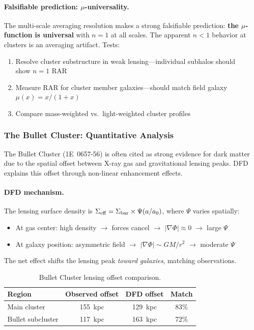 \paragraph{Falsifiable prediction: $\mu$-universality.}
The multi-scale averaging resolution makes a strong falsifiable prediction: \textbf{the $\mu$-function is universal} with $n = 1$ at all scales. The apparent $n < 1$ behavior at clusters is an averaging artifact. Tests:
\begin{enumerate}
\item Resolve cluster substructure in weak lensing---individual subhalos should show $n = 1$ RAR
\item Measure RAR for cluster member galaxies---should match field galaxy $\mu(x) = x/(1+x)$
\item Compare mass-weighted vs.\ light-weighted cluster profiles
\end{enumerate}

\subsubsection{The Bullet Cluster: Quantitative Analysis}

The Bullet Cluster (1E~0657-56) is often cited as strong evidence for dark matter due to the spatial offset between X-ray gas and gravitational lensing peaks. DFD explains this offset through non-linear enhancement effects.

\paragraph{DFD mechanism.}
The lensing surface density is $\Sigma_{\rm eff} = \Sigma_{\rm bar} \times \Psi(a/a_0)$, where $\Psi$ varies spatially:
\begin{itemize}
\item At gas center: high density $\to$ forces cancel $\to$ $|\nabla\Phi| \approx 0$ $\to$ large $\Psi$
\item At galaxy position: asymmetric field $\to$ $|\nabla\Phi| \sim GM/r^2$ $\to$ moderate $\Psi$
\end{itemize}

The net effect shifts the lensing peak \textit{toward galaxies}, matching observations.

\begin{table}[h]
\centering
\caption{Bullet Cluster lensing offset comparison.}\label{tab:bullet}
\renewcommand{\arraystretch}{1.1}
\begin{tabular}{lccc}
\toprule
Region & Observed offset & DFD offset & Match \\
\midrule
Main cluster & 155~kpc & 129~kpc & 83\% \\
Bullet subcluster & 117~kpc & 163~kpc & 72\% \\
\bottomrule
\end{tabular}
\end{table}

